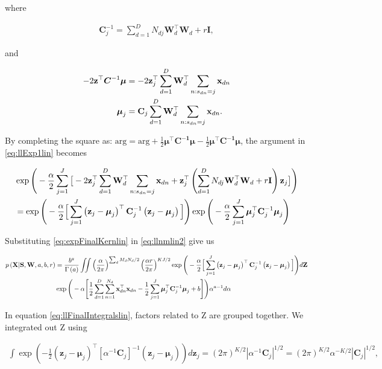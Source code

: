 \documentclass[]{article}
\newcommand{\Z}{\boldsymbol{\mathrm{Z}}}
\newcommand{\Cin}{\mathbf{C}_j}
\newcommand{\muJ}{\boldsymbol{\mu}_j}
\newcommand{\gammaA}{\Gamma\left(a\right)}
\newcommand{\eye}{\mathbf{I}}
\newcommand{\Scluster}{\mathbf{S}}
\newcommand{\WIn}{\mathbf{W}}
\newcommand{\indobj}{\mathbf{x}_{dn}}
\newcommand{\projMatI}{\mathbf{W}_d}
\newcommand{\lvecI}{\mathbf{z}_j}
\begin{document}
where 

\begin{align}
\Cin^{-1} = \sum_{d=1}^{D} N_{dj}\projMatI^\top \projMatI + r\eye,
\end{align}

and

\begin{align}
-2\mathbf{z}^\top \boldsymbol{C}^{-1}\boldsymbol{\mu} &=  -2 \lvecI ^\top  \sum_{d=1}^{D}\projMatI^\top \sum_{n:s_{dn}=j}\indobj \notag \\
\muJ &= \Cin  \sum_{d=1}^{D}\projMatI^\top \sum_{n:s_{dn}=j}\indobj .
\end{align}

By completing the square as: $\textrm{arg} = \textrm{arg} + \frac{1}{2}\boldsymbol{\mu}^\top\boldsymbol{C^{-1}}\boldsymbol{\mu} -\frac{1}{2}\boldsymbol{\mu}^\top\boldsymbol{C^{-1}}\boldsymbol{\mu}$, the argument in \eqref{eq:llExp1lin} becomes

\begin{align}
&\exp\Bigg(-\frac{\alpha}{2}\sum_{j=1}^J \big[ -2 \lvecI ^\top  \sum_{d=1}^{D}\projMatI^\top \sum_{n:s_{dn}=j}\indobj+\lvecI^\top  \left(\sum_{d=1}^{D} N_{dj}\projMatI^\top \projMatI + r\eye\right) \lvecI \big]\Bigg) \notag\\ &= \exp\Bigg(-\frac{\alpha}{2}\Big[\sum_{j=1}^{J} \left(\lvecI-\muJ\right)^\top\Cin^{-1}\left(\lvecI-\muJ\right)\Big]\Bigg)
\exp\Bigg(-\frac{\alpha}{2}\sum_{j=1}^{J}\muJ^\top\Cin^{-1}\muJ\Bigg) \label{eq:expFinalKernlin}
\end{align}


Substituting \eqref{eq:expFinalKernlin} in \eqref{eq:llnmlin2} give us

\begin{align}
p\left(\mathbf{X}|\Scluster,\WIn,a,b,r\right)&=\frac{b^a}{\gammaA}\iint \left(\frac{\alpha}{2\pi}\right)^{\sum_d M_d N_d /2}\left(\frac{\alpha r}{2\pi}\right)^{KJ/2}\exp\Bigg(-\frac{\alpha}{2}\Big[\sum_{j=1}^{J} \left(\lvecI-\muJ\right)^\top\Cin^{-1}\left(\lvecI-\muJ\right)\Big]\Bigg)d\Z \notag\\
&\exp\Bigg(-\alpha\Bigg[\frac{1}{2} \sum_{d=1}^{D}\sum_{n=1}^{N_d}\indobj^\top \indobj  -\frac{1}{2}\sum_{j=1}^{J}\muJ^\top\Cin^{-1}\muJ +b \Bigg]\Bigg)\alpha^{a-1}d\alpha \label{eq:llFinalIntegralslin}
\end{align}

In equation \eqref{eq:llFinalIntegralslin}, factors related to $\Z$ are grouped together. We integrated out $\Z$ using

\begin{align}
\int \exp\left(-\frac{1}{2}\left(\lvecI-\muJ\right)^\top\left[\alpha^{-1}\Cin\right]^{-1}\left(\lvecI-\muJ\right)\right)d\lvecI = \left(2\pi\right)^{K/2}|\alpha^{-1}\Cin|^{1/2} = \left(2\pi\right)^{K/2}\alpha^{-K/2}|\Cin|^{1/2},
\end{align}
\end{document}
